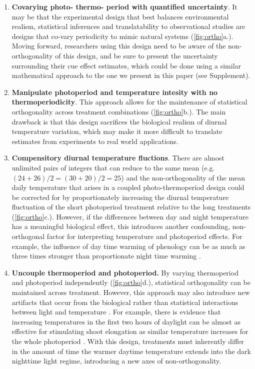 \documentclass[11pt]{article}
\begin{document}
\begin{enumerate}
\item \textbf{Covarying photo- thermo- period with quantified uncertainty}. It may be that the experimental design that best balances environmental realism, statistical inferences and translatability to observational studies are designs that co-vary periodicity to mimic natural systems (\ref{fig:ortho}a.). Moving forward, researchers using this design need to be aware of the non-orthogonality of this design, and be sure to present the uncertainty surrounding their cue effect estimates, which could be done using a similar mathematical approach to the one we present in this paper (see Supplement).

\item \textbf{Manipulate photoperiod and temperature intesity with no thermoperiodicity}. This approach allows for the maintenance of statistical orthogonality across treatment combinations (\ref{fig:ortho}b.). The main drawback is that this design sacrifices the biological realism of diurnal temperature variation, which may make it more difficult to translate estimates from experiments to real world applications.

\item \textbf{Compensitory diurnal temperature fluctions}. There are almost unlimited pairs of integers that can reduce to the same mean (e.g. $(24+26)/2 = (30+20)/2 = 25$) and the non-orthogonality of the mean daily temperature that arises in a coupled photo-thermoperiod design could be corrected for by proportionately increasing the diurnal temperature fluctuation of the short photoperiod treatment relative to the long treatments (\ref{fig:ortho}c.). However, if the differences between day and night temperature has a meaningful biological effect, this introduces another confounding, non-orthogonal factor for interpreting temperature and photoperiod effects. For example, the influence of day time warming of phenology can be as much as three times stronger than proportionate night time warming \citep{Rossi2017,Meng:2020ui}.

\item \textbf{Uncouple thermoperiod and photoperiod.} By varying thermoperiod and photoperiod independently (\ref{fig:ortho}d.), statistical orthogonality can be maintained across treatment. However, this approach may also introduce new artifacts that occur from the biological rather than statistical interactions between light and temperature \citep{Chew:2012wj}. For example, there is evidence that increasing temperatures in the first two hours of daylight can be almost as effective for stimulating shoot elongation as similar temperature increases for the whole photoperiod \citep{Erwin1998}. With this design, treatments must inherently differ in the amount of time the warmer daytime temperature extends into the dark nighttime light regime, introducing a new axes of non-orthogonality.
\end{enumerate}
\end{document}
